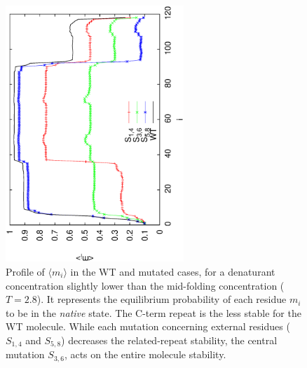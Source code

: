 \begin{figure}
\centering
\includegraphics[angle=-90,width=0.6\textwidth]{./img/wsme/m-mean-profile-2.eps}
\caption{\label{fig:m-mean-prof}Profile of $\langle m_i\rangle$ in the WT and
mutated cases, for a denaturant concentration slightly lower than the
mid-folding concentration ($T=2.8$). 
It represents the equilibrium probability of each residue $m_i$ to
be in the \emph{native} state. 
The C-term repeat is the less stable for the WT molecule. While each mutation concerning
external residues ($S_{1,4}$ and $S_{5,8}$) decreases the related-repeat stability, the central
mutation $S_{3,6}$, acts on the entire molecule stability.}
\end{figure}

